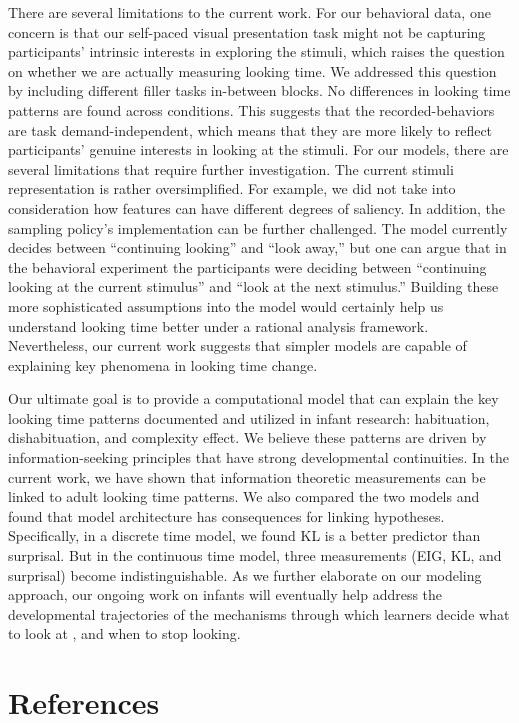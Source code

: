 \documentclass[10pt, letterpaper]{article}
\begin{document}
There are several limitations to the current work. For our behavioral
data, one concern is that our self-paced visual presentation task might
not be capturing participants' intrinsic interests in exploring the
stimuli, which raises the question on whether we are actually measuring
looking time. We addressed this question by including different filler
tasks in-between blocks. No differences in looking time patterns are
found across conditions. This suggests that the recorded-behaviors are
task demand-independent, which means that they are more likely to
reflect participants' genuine interests in looking at the stimuli. For
our models, there are several limitations that require further
investigation. The current stimuli representation is rather
oversimplified. For example, we did not take into consideration how
features can have different degrees of saliency. In addition, the
sampling policy's implementation can be further challenged. The model
currently decides between ``continuing looking'' and ``look away,'' but
one can argue that in the behavioral experiment the participants were
deciding between ``continuing looking at the current stimulus'' and
``look at the next stimulus.'' Building these more sophisticated
assumptions into the model would certainly help us understand looking
time better under a rational analysis framework. Nevertheless, our
current work suggests that simpler models are capable of explaining key
phenomena in looking time change.

Our ultimate goal is to provide a computational model that can explain
the key looking time patterns documented and utilized in infant
research: habituation, dishabituation, and complexity effect. We believe
these patterns are driven by information-seeking principles that have
strong developmental continuities. In the current work, we have shown
that information theoretic measurements can be linked to adult looking
time patterns. We also compared the two models and found that model
architecture has consequences for linking hypotheses. Specifically, in a
discrete time model, we found KL is a better predictor than surprisal.
But in the continuous time model, three measurements (EIG, KL, and
surprisal) become indistinguishable. As we further elaborate on our
modeling approach, our ongoing work on infants will eventually help
address the developmental trajectories of the mechanisms through which
learners decide what to look at , and when to stop looking.

\hypertarget{references}{%
\section{References}\label{references}}
\end{document}
